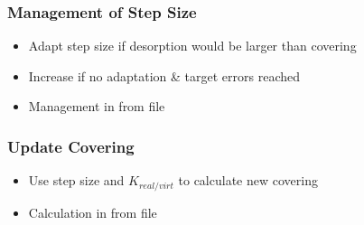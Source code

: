 \subsubsection{Management of Step Size}
\begin{itemize}[noitemsep,topsep=0pt, partopsep=0pt]
\item Adapt step size if desorption would be larger than covering 
\item Increase  if no adaptation \& target errors reached
\item Management in  from  file
\end{itemize}

\subsubsection{Update Covering}
\begin{itemize}[noitemsep,topsep=0pt, partopsep=0pt]
\item Use step size and $K_{real/virt}$ to calculate new covering
\item Calculation in  from  file
\end{itemize}

